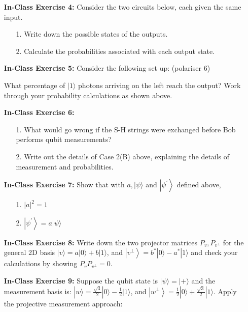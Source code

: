 \documentclass[main.tex]{subfiles}
\begin{document}
\begin{enumerate}
\item[] \textbf{In-Class Exercise 4:} Consider the two circuits below, each given the same input.

    \begin{enumerate}
        \item[1.] Write down the possible states of the outputs.
        \item[2.] Calculate the probabilities associated with each output state.
    \end{enumerate}

\item[] \textbf{In-Class Exercise 5:} Consider the following set up: (polariser 6)

What percentage of $|1\rangle$ photons arriving on the left reach the output? Work through your probability calculations as shown above.

\item[] \textbf{In-Class Exercise 6:}

    \begin{enumerate}
        \item[1.] What would go wrong if the S-H strings were exchanged before Bob performs qubit measurements?
        \item[2.] Write out the details of Case 2(B) above, explaining the details of measurement and probabilities.
    \end{enumerate}

\item[] \textbf{In-Class Exercise 7:} Show that with $a,|\psi\rangle$ and $\left|\psi^{\prime}\right\rangle$ defined above,

    \begin{enumerate}
        \item[1.] $|a|^{2}=1$
        \item[2.] $\left|\psi^{\prime}\right\rangle=a|\psi\rangle$
        \end{enumerate}

\item[] \textbf{In-Class Exercise 8:} Write down the two projector matrices $P_{v}, P_{v^{\perp}}$ for the general 2D basis $|v\rangle=a|0\rangle+b|1\rangle$, and $\left|v^{\perp}\right\rangle=b^{*}|0\rangle-a^{*}|1\rangle$ and check your calculations by showing $P_{v} P_{v^{\perp}}=0$.

\item[] \textbf{In-Class Exercise 9:} Suppose the qubit state is $|\psi\rangle=|+\rangle$ and the measurement basis is: $|w\rangle=\frac{\sqrt{3}}{2}|0\rangle-\frac{1}{2}|1\rangle$, and $\left|w^{\perp}\right\rangle=\frac{1}{2}|0\rangle+\frac{\sqrt{3}}{2}|1\rangle$. Apply the projective measurement approach:


\end{enumerate}
\end{document}
